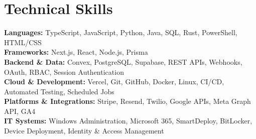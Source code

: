 \documentclass[letterpaper,11pt]{article}
\begin{document}
\section{Technical Skills}
\vspace{2pt}
\small{
\textbf{Languages:} TypeScript, JavaScript, Python, Java, SQL, Rust, PowerShell, HTML/CSS \\
\textbf{Frameworks:} Next.js, React, Node.js, Prisma \\
\textbf{Backend \& Data:} Convex, PostgreSQL, Supabase, REST APIs, Webhooks, OAuth, RBAC, Session Authentication \\
\textbf{Cloud \& Development:} Vercel, Git, GitHub, Docker, Linux, CI/CD, Automated Testing, Scheduled Jobs \\
\textbf{Platforms \& Integrations:} Stripe, Resend, Twilio, Google APIs, Meta Graph API, GA4 \\
\textbf{IT Systems:} Windows Administration, Microsoft 365, SmartDeploy, BitLocker, Device Deployment, Identity \& Access Management
}
\end{document}
